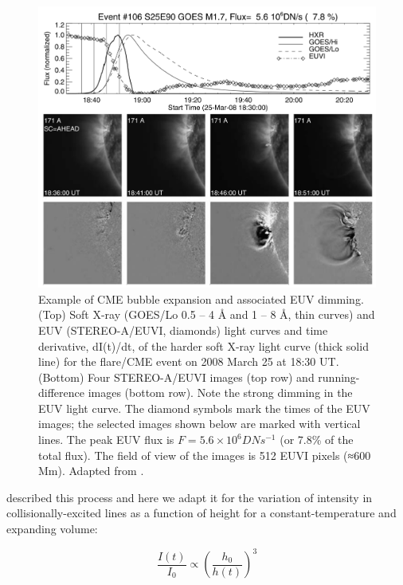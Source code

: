 \begin{figure}[!h]
    \begin{center}
	    \includegraphics[width=\textwidth]{Images/CMEExpansionLimb.png}
    \end{center}
    \caption[Limb CME expansion and dimming]{
        Example of CME bubble expansion and associated EUV dimming. (Top) Soft X-ray (GOES/Lo 0.5 – 4 Å and 1 – 8 Å, thin 
        curves) and EUV (STEREO-A/EUVI, diamonds) light curves and time derivative, dI(t)/dt, of the harder soft X-ray 
        light curve (thick solid line) for the flare/CME event on 2008 March 25 at 18:30 UT. (Bottom) Four STEREO-A/EUVI 
        images (top row) and running-difference images (bottom row). Note the strong dimming in the EUV light curve.
        The diamond symbols mark the times of the EUV images; the selected images shown below are marked with
        vertical lines. The peak EUV flux is $F = 5.6 \times 10^6 DN s^{−1}$ (or 7.8\% of the total flux). The field of 
        view of the images is 512 EUVI pixels (≈600 Mm). Adapted from \citet{Aschwanden2009a}. 
   	}
    \label{fig:limbcmedimming}
\end{figure}

\citet{Aschwanden2009a} described this process and here we adapt it for the variation of intensity in collisionally-excited lines as a function of height for a constant-temperature and expanding volume:

\begin{equation}
    \frac{I(t)}{I_0} \propto \left(\frac{h_0}{h(t)}\right)^3
    \label{eq:irradiancevsheight}
\end{equation}

